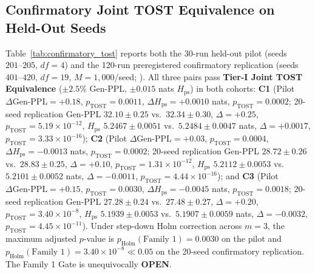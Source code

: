 \documentclass[11pt,a4paper]{article}
\begin{document}
\subsection{Confirmatory Joint TOST Equivalence on Held-Out Seeds}
Table~\ref{tab:confirmatory_tost} reports both the 30-run held-out pilot (seeds $201\text{--}205$, $df=4$) and the 120-run preregistered confirmatory replication (seeds $401\text{--}420$, $df=19$, $M=1{,}000$/seed; ). All three pairs pass \textbf{Tier-I Joint TOST Equivalence} ($\pm 2.5\%$ Gen-PPL, $\pm 0.015$ nats $H_{\mathrm{ps}}$) in both cohorts:
\textbf{C1} (Pilot $\Delta\text{Gen-PPL} = +0.18$, $p_{\mathrm{TOST}} = 0.0011$, $\Delta H_{\mathrm{ps}} = +0.0010$ nats, $p_{\mathrm{TOST}} = 0.0002$; 20-seed replication Gen-PPL $32.10\pm 0.25$ vs.\ $32.34\pm 0.30$, $\Delta = +0.25$, $p_{\mathrm{TOST}} = 5.19\times 10^{-12}$, $H_{\mathrm{ps}}$ $5.2467\pm 0.0051$ vs.\ $5.2484\pm 0.0047$ nats, $\Delta = +0.0017$, $p_{\mathrm{TOST}} = 3.33\times 10^{-16}$);
\textbf{C2} (Pilot $\Delta\text{Gen-PPL} = +0.03$, $p_{\mathrm{TOST}} = 0.0004$, $\Delta H_{\mathrm{ps}} = -0.0013$ nats, $p_{\mathrm{TOST}} = 0.0002$; 20-seed replication Gen-PPL $28.72\pm 0.26$ vs.\ $28.83\pm 0.25$, $\Delta = +0.10$, $p_{\mathrm{TOST}} = 1.31\times 10^{-12}$, $H_{\mathrm{ps}}$ $5.2112\pm 0.0053$ vs.\ $5.2101\pm 0.0052$ nats, $\Delta = -0.0011$, $p_{\mathrm{TOST}} = 4.44\times 10^{-16}$); and
\textbf{C3} (Pilot $\Delta\text{Gen-PPL} = +0.15$, $p_{\mathrm{TOST}} = 0.0030$, $\Delta H_{\mathrm{ps}} = -0.0045$ nats, $p_{\mathrm{TOST}} = 0.0018$; 20-seed replication Gen-PPL $27.28\pm 0.24$ vs.\ $27.48\pm 0.27$, $\Delta = +0.20$, $p_{\mathrm{TOST}} = 3.40\times 10^{-8}$, $H_{\mathrm{ps}}$ $5.1939\pm 0.0053$ vs.\ $5.1907\pm 0.0059$ nats, $\Delta = -0.0032$, $p_{\mathrm{TOST}} = 4.45\times 10^{-11}$).
Under step-down Holm correction across $m=3$, the maximum adjusted $p$-value is $p_{\mathrm{Holm}}(\text{Family 1}) = 0.0030$ on the pilot and $p_{\mathrm{Holm}}(\text{Family 1}) = 3.40\times 10^{-8} \ll 0.05$ on the 20-seed confirmatory replication. The Family 1 Gate is unequivocally \textbf{OPEN}.
\end{document}
